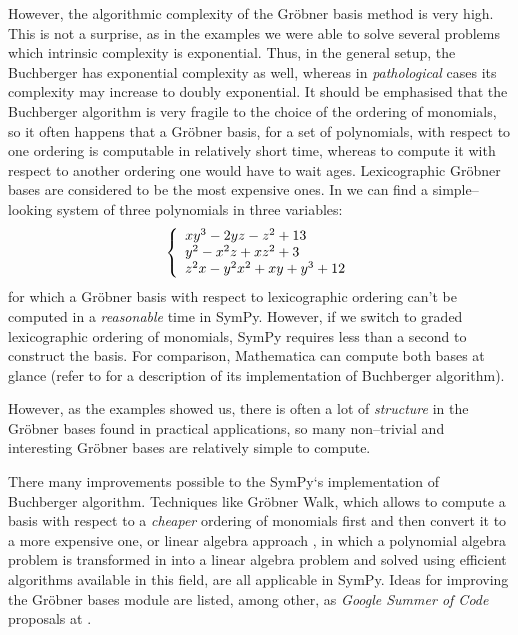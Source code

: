 However, the algorithmic complexity of the Gröbner basis method is very high. This is not a
surprise, as in the examples we were able to solve several problems which intrinsic complexity
is exponential. Thus, in the general setup, the Buchberger has exponential complexity as well,
whereas in \emph{pathological} cases its complexity may increase to doubly exponential. It should be
emphasised that the Buchberger algorithm is very fragile to the choice of the ordering of
monomials, so it often happens that a Gröbner basis, for a set of polynomials, with respect
to one ordering is computable in relatively short time, whereas to compute it with respect to
another ordering one would have to wait ages. Lexicographic Gröbner bases are considered to
be the most expensive ones. In \cite{Buchberger2001systems} we can find a simple--looking system
of three polynomials in three variables:
\begin{gather}
\begin{split}\left\{
\begin{array}{l}
    x y^3 - 2 y z - z^2 + 13          \\
    y^2 - x^2 z + x z^2 + 3           \\
    z^2 x - y^2 x^2 + x y + y^3 + 12
\end{array}
\right.\end{split}\notag
\end{gather}
for which a Gröbner basis with respect to lexicographic ordering can't be computed in a \emph{reasonable}
time in SymPy. However, if we switch to graded lexicographic ordering of monomials, SymPy requires
less than a second to construct the basis. For comparison, Mathematica can compute both bases at glance
(refer to \cite{MathematicaInternal} for a description of its implementation of Buchberger algorithm).

However, as the examples showed us, there is often a lot of \emph{structure} in the Gröbner bases found
in practical applications, so many non--trivial and interesting Gröbner bases are relatively simple
to compute.

There many improvements possible to the SymPy`s implementation of Buchberger algorithm. Techniques like
Gröbner Walk, which allows to compute a basis with respect to a \emph{cheaper} ordering of monomials first
and then convert it to a more expensive one, or linear algebra approach \cite{Faugere1999f4}, in which a
polynomial algebra problem is transformed in into a linear algebra problem and solved using efficient
algorithms available in this field, are all applicable in SymPy. Ideas for improving the Gröbner
bases module are listed, among other, as \emph{Google Summer of Code} proposals at \cite{SymPyGSoC2010}.

